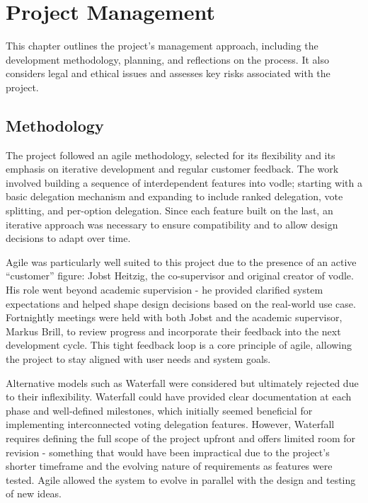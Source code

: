 \chapter{Project Management}

This chapter outlines the project's management approach, including the development methodology, planning, and reflections on the process. It also considers legal and ethical issues and assesses key risks associated with the project.

\section{Methodology}
The project followed an agile methodology, selected for its flexibility and its emphasis on iterative development and regular customer feedback. The work involved building a sequence of interdependent features into vodle; starting with a basic delegation mechanism and expanding to include ranked delegation, vote splitting, and per-option delegation. Since each feature built on the last, an iterative approach was necessary to ensure compatibility and to allow design decisions to adapt over time.

Agile was particularly well suited to this project due to the presence of an active ``customer'' figure: Jobst Heitzig, the co-supervisor and original creator of vodle. His role went beyond academic supervision - he provided clarified system expectations and helped shape design decisions based on the real-world use case. Fortnightly meetings were held with both Jobst and the academic supervisor, Markus Brill, to review progress and incorporate their feedback into the next development cycle. This tight feedback loop is a core principle of agile, allowing the project to stay aligned with user needs and system goals.

Alternative models such as Waterfall were considered but ultimately rejected due to their inflexibility. Waterfall could have provided clear documentation at each phase and well-defined milestones, which initially seemed beneficial for implementing interconnected voting delegation features. However, Waterfall requires defining the full scope of the project upfront and offers limited room for revision - something that would have been impractical due to the project's shorter timeframe and the evolving nature of requirements as features were tested. Agile allowed the system to evolve in parallel with the design and testing of new ideas.

